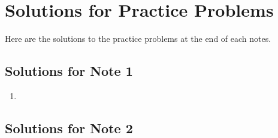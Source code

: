 \documentclass[../main.tex]{subfiles}
\begin{document}
\chapter{Solutions for Practice Problems}

Here are the solutions to the practice problems at the end of each
notes.

\section{Solutions for Note 1}
\begin{enumerate}
\item
\end{enumerate}

\section{Solutions for Note 2}
\end{document}
